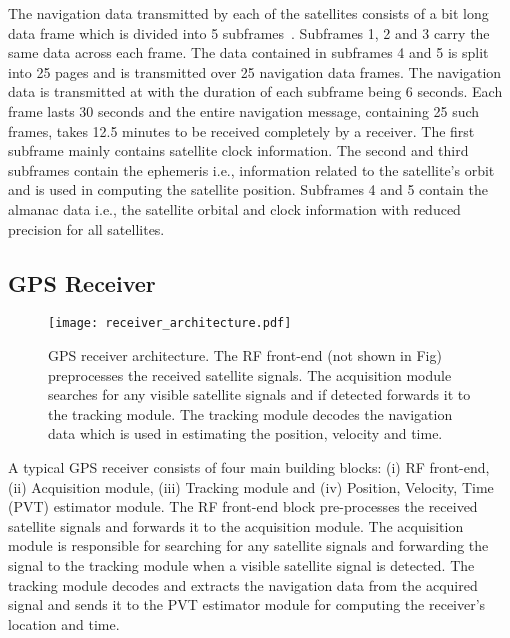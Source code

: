 \documentclass[letterpaper,twocolumn,10pt]{article}
\newcommand{\ie}{i.e.,\xspace}
\begin{document}
The navigation data transmitted by each of the satellites consists of a  bit long data frame which is divided into 5 subframes~\cite{borre2007software}. Subframes 1, 2 and 3 carry the same data across each frame. The data contained in subframes 4 and 5 is split into 25 pages and is transmitted over 25 navigation data frames. The navigation data is transmitted at  with the duration of each subframe being 6 seconds. Each frame lasts 30 seconds and the entire navigation message, containing 25 such frames, takes 12.5 minutes to be received completely by a receiver. The first subframe mainly contains satellite clock information. The second and third subframes contain the ephemeris \ie information related to the satellite's orbit and is used in computing the satellite position. Subframes 4 and 5 contain the almanac data \ie the satellite orbital and clock information with reduced precision for all satellites. 




\subsection{GPS Receiver}
\label{sub:gps-rx-overview}
\begin{figure}[t]
  \centering
  \texttt{[image: receiver\_architecture.pdf]}
  \caption{GPS receiver architecture. The RF front-end (not shown in Fig) preprocesses the received satellite signals. The acquisition module searches for any visible satellite signals and if detected forwards it to the tracking module. The tracking module decodes the navigation data which is used in estimating the position, velocity and time.}
  \label{fig:gps-rx-architecture}
\end{figure}


A typical GPS receiver consists of four main building blocks: (i) RF front-end, (ii) Acquisition module, (iii) Tracking module and (iv) Position, Velocity, Time (PVT) estimator module. The RF front-end block pre-processes the received satellite signals and forwards it to the acquisition module. The acquisition module is responsible for searching for any satellite signals and forwarding the signal to the tracking module when a visible satellite signal is detected. The tracking module decodes and extracts the navigation data from the acquired signal and sends it to the PVT estimator module for computing the receiver’s location and time.
\end{document}
